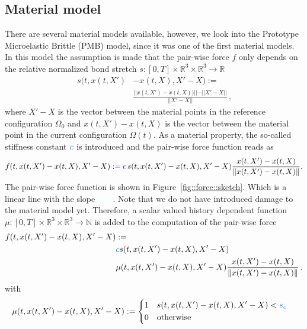\subsection{Material model}
There are several material models available, however, we look into the Prototype Microelastic Brittle (PMB) model, since it was one of the first material models. In this model the assumption is made that the pair-wise force $f$ only depends on the relative normalized bond stretch $s:[0,T]\times\mathbb{R}^3\times\mathbb{R}^3\rightarrow\mathbb{R}$
\begin{align}
s(t,x(t,X')&-x(t,X),X'-X):= \\ &\frac{\vert\vert x(t,X')-x(t,X))\vert\vert - \vert\vert X'-X\vert\vert}{\vert\vert X'-X\vert\vert}\,\text{,} 
\end{align}
where $X'-X$ is the vector between the material points in the reference configuration $\Omega_0$ and $x(t,X')-x(t,X)$ is the vector between the material point in the current configuration $\Omega(t)$. As a material property, the so-called stiffness constant $\textcolor{azure}{c}$ is introduced and the pair-wise force function reads as
\begin{align}
f(t,x(t,X')-x(t,X),X'-X):=  \textcolor{blue}{c} \, s(t,x(t,X')-x(t,X),X'-X)\frac{x(t,X')-x(t,X)}{\Vert x(t,X')-x(t,X)\Vert} \text{.}
\end{align}
The pair-wise force function is shown in Figure~\ref{fig::force::sketch}. Which is a linear line with the slope \textcolor{azure}{blue}. Note that we do not have introduced damage to the material model yet. Therefore, a scalar valued history dependent function $\mu:[0,T]\times\mathbb{R}^3\times\mathbb{R}^3\rightarrow\mathbb{N}$ is added to the computation of the pair-wise force
\begin{align}
f(t,x(t,X')-x(t,X),X'-X)&:= \notag\\ & \textcolor{azure}{c} s(t,x(t,X')-x(t,X),X'-X) \notag\\&\mu\args \frac{x(t,X')-x(t,X)}{\Vert x(t,X')-x(t,X)\Vert}\,\text{.} 
\end{align}
with
\begin{align}
\mu(t,x(t,X')&-x(t,X),X'-X):= 
 \left\{
 \begin{aligned}
 & 1 \quad s(t,x(t,X')-x(t,X),X'-X) < \textcolor{azure}{s_{c}} \\
 & 0 \quad \text{otherwise}
\end{aligned}
 \right.
\end{align}
